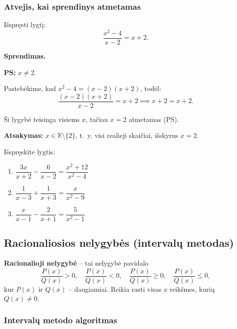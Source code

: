 \subsubsection*{Atvejis, kai sprendinys atmetamas}

\begin{example}
Išspręsti lygtį:
\[
    \frac{x^2 - 4}{x - 2} = x + 2.
\]

\textbf{Sprendimas.}

\textbf{PS:} $x \neq 2$.

Pastebėkime, kad $x^2 - 4 = (x-2)(x+2)$, todėl:
\[
    \frac{(x-2)(x+2)}{x-2} = x+2 \implies x + 2 = x + 2.
\]

Ši lygybė teisinga visiems $x$, tačiau $x = 2$ atmetamas (PS).

\textbf{Atsakymas:} $x \in \mathbb{R} \setminus \{2\}$, t.~y. visi realieji skaičiai, išskyrus $x = 2$.
\end{example}

\begin{exercise}
Išspręskite lygtis:
\begin{enumerate}[label=\alph*)]
    \item $\dfrac{3x}{x+2} - \dfrac{6}{x-2} = \dfrac{x^2+12}{x^2-4}$
    \item $\dfrac{1}{x-3} + \dfrac{1}{x+3} = \dfrac{x}{x^2 - 9}$
    \item $\dfrac{x}{x-1} - \dfrac{2}{x+1} = \dfrac{5}{x^2-1}$
\end{enumerate}
\end{exercise}

\subsection{Racionaliosios nelygybės (intervalų metodas)}

\begin{definition}
\textbf{Racionalioji nelygybė} -- tai nelygybė pavidalo
\[
    \frac{P(x)}{Q(x)} > 0, \quad \frac{P(x)}{Q(x)} < 0, \quad \frac{P(x)}{Q(x)} \geq 0, \quad \frac{P(x)}{Q(x)} \leq 0,
\]
kur $P(x)$ ir $Q(x)$ -- daugiamiai. Reikia rasti visas $x$ reikšmes, kurių $Q(x) \neq 0$.
\end{definition}

\subsubsection*{Intervalų metodo algoritmas}

